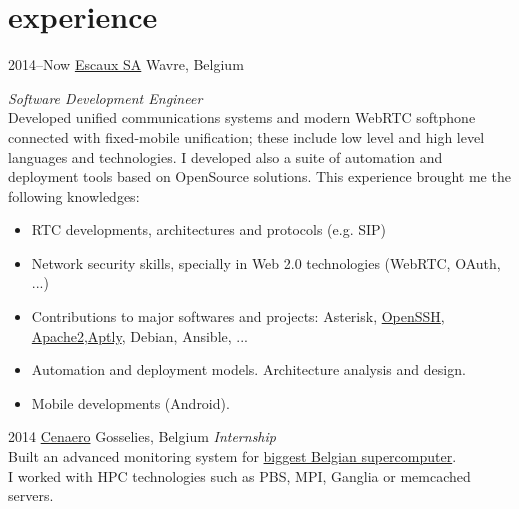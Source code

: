 \documentclass[]{friggeri-cv} %
\begin{document}

\section{experience}

\begin{entrylist}
\entry
{2014--Now}
{\href{http://escaux.com}{Escaux SA}}
{Wavre, Belgium}
{\emph{Software Development Engineer} \\
Developed unified communications systems and modern WebRTC softphone connected with fixed-mobile unification; these include low level and high level languages and technologies. I developed also a suite of automation and deployment tools based on OpenSource solutions. This experience brought me the following knowledges:
\begin{itemize}
\item RTC developments, architectures and protocols (e.g. SIP)
\item Network security skills, specially in Web 2.0 technologies (WebRTC, OAuth, ...)
\item Contributions to major softwares and projects: Asterisk, \href{http://lists.mindrot.org/pipermail/openssh-unix-dev/2016-December/035563.html}{OpenSSH}, \href{https://github.com/rmedaer/mod_psm}{Apache2},\href{https://github.com/smira/aptly/pull/390}{Aptly}, Debian, Ansible, ...
\item Automation and deployment models. Architecture analysis and design.
\item Mobile developments (Android).
\end{itemize}}
\entry
{2014}
{\href{http://www.cenaero.be/}{Cenaero}}
{Gosselies, Belgium}
{\emph{Internship} \\
Built an advanced monitoring system for \href{https://www.top500.org/system/178439}{biggest Belgian supercomputer}. \\
I worked with HPC technologies such as PBS, MPI, Ganglia or memcached servers.}
\end{entrylist}

\end{document}
